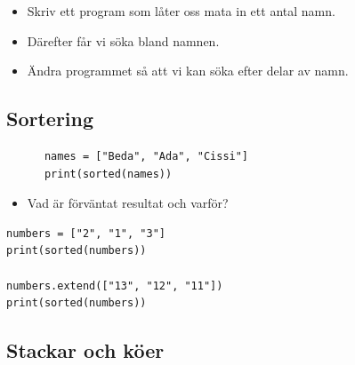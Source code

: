 \begin{frame}[fragile]
  \begin{exercise}[search.py]
    \begin{itemize}
      \item Skriv ett program som låter oss mata in ett antal 
        namn.
      \item Därefter får vi söka bland namnen.
    \end{itemize}
  \end{exercise}

  \begin{exercise}
    \begin{itemize}
      \item Ändra programmet så att vi kan söka efter delar av namn.
    \end{itemize}
  \end{exercise}
\end{frame}

\subsection{Sortering}

\begin{frame}[fragile]
  \begin{example}[Sortering]
    \begin{verbatim}
      names = ["Beda", "Ada", "Cissi"]
      print(sorted(names))
    \end{verbatim}
  \end{example}

  \begin{exercise}
    \begin{itemize}
      \item Vad är förväntat resultat och varför?
    \end{itemize}
    \begin{verbatim}
numbers = ["2", "1", "3"]
print(sorted(numbers))

numbers.extend(["13", "12", "11"])
print(sorted(numbers))
    \end{verbatim}
  \end{exercise}
\end{frame}


\subsection{Stackar och köer}

\begin{frame}[fragile]
  \begin{example}[pile.py]
    \inputminted{python}{examples/pile.py}
  \end{example}
\end{frame}


